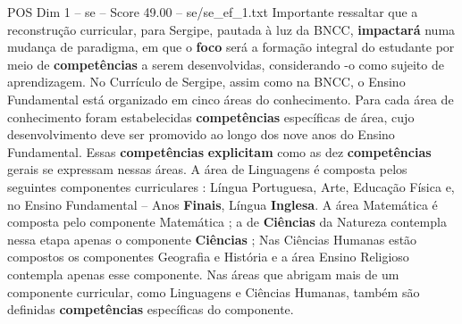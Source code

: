 \begin{textsample}{POS Dim 1 – se – Score 49.00 – se/se\_ef\_1.txt}
Importante ressaltar que a reconstrução curricular, para Sergipe, pautada à luz da BNCC, \textbf{impactará} numa mudança de paradigma, em que o \textbf{foco} será a formação integral do estudante por meio de \textbf{competências} a serem desenvolvidas, considerando -o como sujeito de aprendizagem.
No Currículo de Sergipe, assim como na BNCC, o Ensino Fundamental está organizado em cinco áreas do conhecimento.
Para cada área de conhecimento foram estabelecidas \textbf{competências} específicas de área, cujo desenvolvimento deve ser promovido ao longo dos nove anos do Ensino Fundamental.
Essas \textbf{competências} \textbf{explicitam} como as dez \textbf{competências} gerais se expressam nessas áreas.
A área de Linguagens é composta pelos seguintes componentes curriculares : Língua Portuguesa, Arte, Educação Física e, no Ensino Fundamental – Anos \textbf{Finais}, Língua \textbf{Inglesa}.
A área Matemática é composta pelo componente Matemática ; a de \textbf{Ciências} da Natureza contempla nessa etapa apenas o componente \textbf{Ciências} ; Nas Ciências Humanas estão compostos os componentes Geografia e História e a área Ensino Religioso contempla apenas esse componente.
Nas áreas que abrigam mais de um componente curricular, como Linguagens e Ciências Humanas, também são definidas \textbf{competências} específicas do componente.

\end{textsample}
